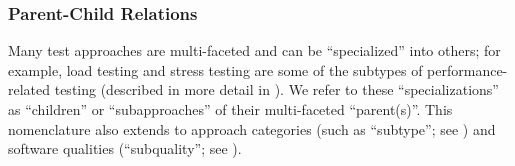 
\subsubsection{Parent-Child Relations}\label{par-chd-rels}
Many test approaches are multi-faceted and can be ``specialized'' into others;
for example, load testing and stress testing are some of the subtypes of
performance-related testing (described in more detail in ).
We refer to these ``specializations'' as ``children'' or ``subapproaches'' of
their multi-faceted ``parent(s)''. This nomenclature also extends to approach
categories (such as ``subtype''; see ) and software
qualities (``subquality''\ifnotpaper; see \fi).

